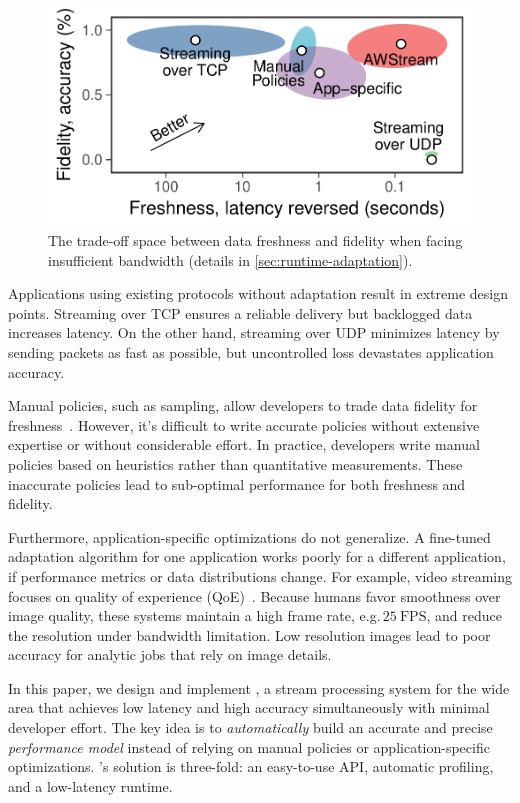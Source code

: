 \begin{figure}
  \centering
  \includegraphics[width=0.9\columnwidth]{figures/figure1.pdf}
  \caption{The trade-off space between data freshness and fidelity when facing
    insufficient bandwidth (details in \autoref{sec:runtime-adaptation}).}
  \label{fig:intro}
  \vspace{-1em}
\end{figure}

Applications using existing protocols without adaptation result in extreme
design points. Streaming over TCP ensures a reliable delivery but backlogged
data increases latency. On the other hand, streaming over UDP minimizes latency
by sending packets as fast as possible, but uncontrolled loss devastates
application accuracy.

Manual policies, such as sampling, allow developers to trade data fidelity for
freshness~\cite{rabkin2014aggregation}. However, it's difficult to write
accurate policies without extensive expertise or without considerable effort. In
practice, developers write manual policies based on heuristics rather than
quantitative measurements. These inaccurate policies lead to sub-optimal
performance for both freshness and fidelity.

Furthermore, application-specific optimizations do not generalize. A fine-tuned
adaptation algorithm for one application works poorly for a different
application, if performance metrics or data distributions change.  For example,
video streaming focuses on quality of experience
(QoE)~\cite{michalos2012dynamic, pantos2016http, yin2015control}. Because humans
favor smoothness over image quality, these systems maintain a high frame rate,
e.g.\,\(25~\text{FPS}\), and reduce the resolution under bandwidth limitation.
Low resolution images lead to poor accuracy for analytic jobs that rely on image
details.

In this paper, we design and implement \sysname{}, a stream processing system
for the wide area that achieves low latency and high accuracy simultaneously
with minimal developer effort. The key idea is to \textit{automatically} build
an accurate and precise \textit{performance model} instead of relying on manual
policies or application-specific optimizations. \sysname{}'s solution is
three-fold: an easy-to-use API, automatic profiling, and a low-latency runtime.

